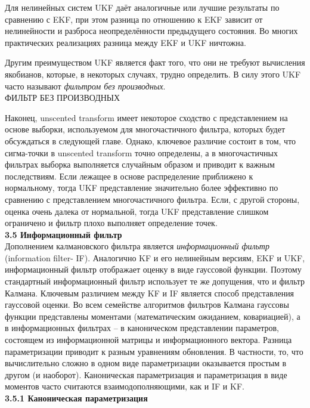 \documentclass[10pt,a4paper]{article}
\begin{document}
Для нелинейных систем UKF даёт аналогичные или лучшие результаты по сравнению с EKF, при этом разница по отношению к EKF зависит от нелинейности и разброса неопределённости предыдущего состояния. Во многих практических реализациях разница между EKF и UKF ничтожна.

Другим преимуществом UKF является факт того, что они не требуют вычисления якобианов, которые, в некоторых случаях, трудно определить. В силу этого UKF часто называют \textit{фильтром без производных}.\\
ФИЛЬТР БЕЗ ПРОИЗВОДНЫХ

Наконец, unscented transform имеет некоторое сходство с представлением на основе выборки, используемом для многочастичного фильтра, которых будет обсуждаться в следующей главе. Однако, ключевое различие состоит в том, что сигма-точки в unscented transform точно определены, а в многочастичных фильтрах выборка выполняется случайным образом и приводит к важным последствиям. Если лежащее в основе распределение приближено к нормальному, тогда UKF представление значительно более эффективно по сравнению с представлением многочастичного фильтра. Если, с другой стороны, оценка очень далека от нормальной, тогда UKF представление слишком ограничено и фильтр плохо выполняет определение точек.\\

\textbf{3.5 Информационный фильтр}\\

Дополнением калмановского фильтра является \textit{информационный фильтр} (information filter- IF). Аналогично KF и его нелинейным версиям, EKF и UKF, информационный фильтр отображает оценку в виде гауссовой функции. Поэтому стандартный информационный фильтр использует те же допущения, что и фильтр Калмана. Ключевым различием между KF и IF является способ представления гауссовой оценки. Во всем семействе алгоритмов фильтров Калмана гауссовы функции представлены моментами (математическим ожиданием, ковариацией), а в информационных фильтрах – в каноническом представлении параметров, состоящем из информационной матрицы и информационного вектора. Разница параметризации приводит к разным уравнениям обновления. В частности, то, что вычислительно сложно в одном виде параметризации оказывается простым в другом (и наоборот). Каноническая параметризация и параметризация в виде моментов часто считаются взаимодополняющими, как и IF и KF.\\

\textbf{3.5.1 Каноническая параметризация}\\
\end{document}
